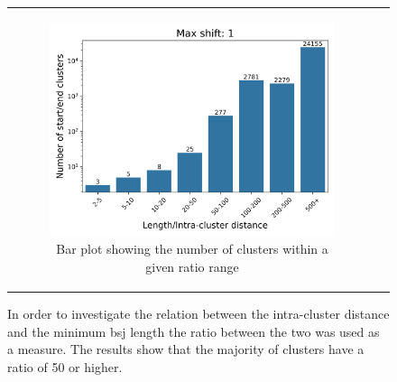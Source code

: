 \begin{figure}[ht]
\begin{tabular}{cc}
\begin{subfigure}{0.5\textwidth}
                       \includegraphics[width=\linewidth]{chapters/4_results_and_discussion/figures/detection/distances/diff_1_bar.png}
                       \caption{Bar plot showing the number of clusters within
                           a given ratio range}
                       \label{fig:clustering_bar} \end{subfigure}\end{tabular}
    \caption{In order to
        investigate the relation between the intra-cluster distance and the
        minimum
        \gls{bsj} length the ratio between the two was used as a measure.
        The results show that the majority of clusters have a ratio of 50 or higher.
    }
    \label{fig:clustering}
\end{figure}
